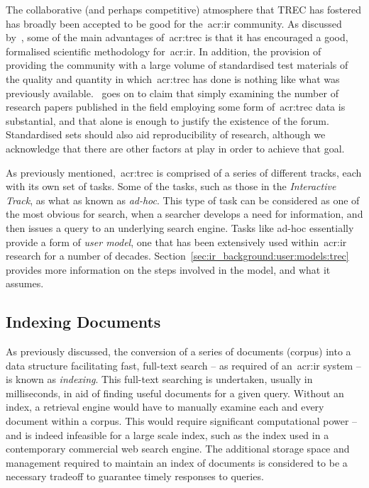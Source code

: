 The collaborative (and perhaps competitive) atmosphere that TREC has fostered has broadly been accepted to be good for the~\gls{acr:ir} community. As discussed by~\cite{robertson2008history_ir_evaluation}, some of the main advantages of~\gls{acr:trec} is that it has encouraged a good, formalised scientific methodology for~\gls{acr:ir}. In addition, the provision of providing the community with a large volume of standardised test materials of the quality and quantity in which~\gls{acr:trec} has done is nothing like what was previously available.~\cite{robertson2008history_ir_evaluation} goes on to claim that simply examining the number of research papers published in the field employing some form of~\gls{acr:trec} data is substantial, and that alone is enough to justify the existence of the forum. Standardised sets should also aid reproducibility of research, although we acknowledge that there are other factors at play in order to achieve that goal. 

As previously mentioned,~\gls{acr:trec} is comprised of a series of different tracks, each with its own set of tasks. Some of the tasks, such as those in the \emph{Interactive Track}, as what as known as \emph{ad-hoc}. This type of task can be considered as one of the most obvious for search, when a searcher develops a need for information, and then issues a query to an underlying search engine. Tasks like ad-hoc essentially provide a form of \emph{user model}, one that has been extensively used within~\gls{acr:ir} research for a number of decades. Section~\ref{sec:ir_background:user:models:trec} provides more information on the steps involved in the model, and what it assumes.

\subsection{Indexing Documents}\label{sec:ir_background:basics:indexing}
As previously discussed, the conversion of a series of documents (corpus) into a data structure facilitating fast, full-text search -- as required of an~\gls{acr:ir} system -- is known as \emph{indexing}. This full-text searching is undertaken, usually in milliseconds, in aid of finding useful documents for a given query. Without an index, a retrieval engine would have to manually examine each and every document within a corpus. This would require significant computational power -- and is indeed infeasible for a large scale index, such as the index used in a contemporary commercial web search engine. The additional storage space and management required to maintain an index of documents is considered to be a necessary tradeoff to guarantee timely responses to queries.

